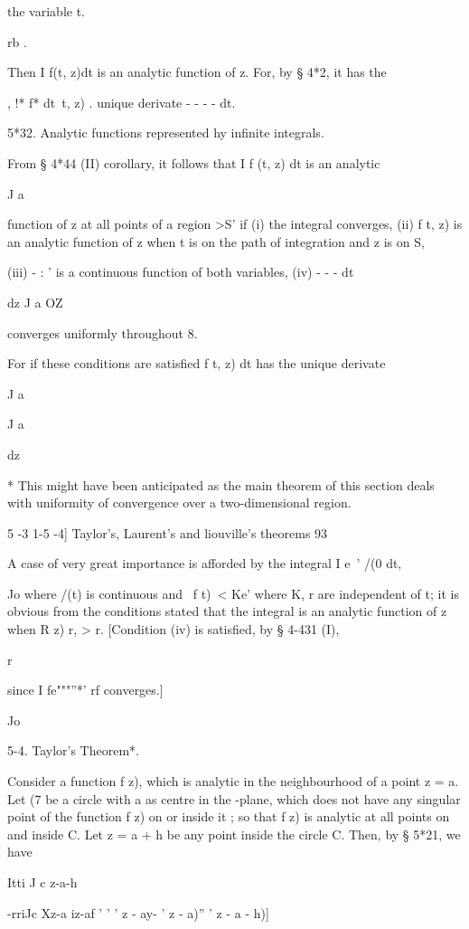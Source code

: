 {{the variable t.

rb .

Then I f(t, z)dt is an analytic function of z. For, by § 4*2, it has
the

, !* f* dt\ t, z) . unique derivate - - - - dt.

5*32. Analytic functions represented hy infinite integrals.

From § 4*44 (II) corollary, it follows that I f (t, z) dt is an
analytic

J a

function of z at all points of a region >S' if (i) the integral
converges, (ii) f t, z) is an analytic function of z when t is on the
path of integration and z is on S,

(iii) - : ' is a continuous function of both variables, (iv) - - - dt

dz J a OZ

converges uniformly throughout 8.

For if these conditions are satisfied f t, z) dt has the unique
derivate

J a

J a

dz

* This might have been anticipated as the main theorem of this section
deals with uniformity of convergence over a two-dimensional region.

5 -3 1-5 -4] Taylor's, Laurent's and liouville's theorems 93

A case of very great importance is afforded by the integral I e~' /(0
dt,

Jo where /(t) is continuous and \ f t)\ < Ke' where K, r are
independent of t; it is obvious from the conditions stated that the
integral is an analytic function of z when R z) r, > r. [Condition
(iv) is satisfied, by § 4-431 (I),

r

since I fe"""''*' rf converges.]

Jo

5-4. Taylor's Theorem*.

Consider a function f z), which is analytic in the neighbourhood of a
point z = a. Let (7 be a circle with a as centre in the -plane, which
does not have any singular point of the function f z) on or inside it
; so that f z) is analytic at all points on and inside C. Let z = a +
h be any point inside the circle C. Then, by § 5*21, we have

    Itti J c z-a-h

 -rriJc Xz-a iz-af ' ' ' z - ay- ' z - a)'' ' z - a - h)]

}}
